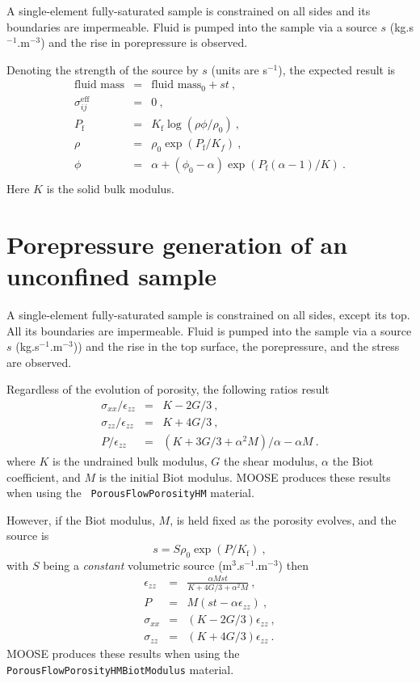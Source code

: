 \documentclass[]{scrreprt}
\begin{document}
A single-element fully-saturated sample is constrained on all sides
and its boundaries are impermeable.  Fluid is pumped into the sample
via a source $s$ (kg.s$^{-1}$.m$^{-3}$) and the rise
in porepressure is observed.

Denoting the strength of the source by $s$ (units are s$^{-1}$), the expected result is
\begin{eqnarray}
\mbox{fluid mass} & = & \mbox{fluid mass}_{0} + st \ , \nonumber \\
\sigma_{ij}^{\mathrm{eff}} & = & 0 \ , \nonumber \\
P_{\mathrm{f}} & = & K_{\mathrm{f}}\log(\rho\phi/\rho_{0}) \ , \nonumber
\\
\rho & = & \rho_{0}\exp(P_{\mathrm{f}}/K_{f}) \ , \nonumber \\
\phi & = & \alpha + (\phi_{0}-\alpha)\exp\left(
P_{\mathrm{f}}(\alpha - 1)/K\right) \ . \\
\end{eqnarray}
Here $K$ is the solid bulk modulus.

\section{Porepressure generation of an unconfined sample}

A single-element fully-saturated sample is constrained on all sides,
except its top.  All its boundaries are impermeable.  Fluid is pumped
into the sample via a source $s$ (kg.s$^{-1}$.m$^{-3}$)) and the rise
in the top surface, the porepressure, and the stress are observed.

Regardless of the evolution of porosity, the following ratios result
\begin{eqnarray}
\sigma_{xx}/\epsilon_{zz} & = & K - 2G/3 \ , \nonumber \\
\sigma_{zz}/\epsilon_{zz} & = & K + 4G/3 \ , \nonumber \\
P/\epsilon_{zz} & = & (K + 3G/3 + \alpha^{2}M)/\alpha - \alpha M \ .
\end{eqnarray}
where $K$ is the undrained bulk modulus, $G$ the shear modulus,
$\alpha$ the Biot coefficient, and $M$ is the initial Biot modulus.
MOOSE produces these results when using the {\tt
  PorousFlowPorosityHM} material.


However, if the Biot modulus, $M$, is held fixed as the porosity
evolves, and the source is
\begin{equation}
s = S \rho_{0}\exp(P/K_{\mathrm{f}}) \ ,
\end{equation}
with $S$ being a {\em constant} volumetric source
(m$^{3}$.s$^{-1}$.m$^{-3}$) then
\begin{eqnarray}
\epsilon_{zz} & = & \frac{\alpha M s t}{K + 4G/3 + \alpha^{2}M} \ ,
\nonumber \\
P & = & M(st - \alpha\epsilon_{zz}) \ , \nonumber \\
\sigma_{xx} & = & (K - 2G/3)\epsilon_{zz} \ , \nonumber \\
\sigma_{zz} & = & (K + 4G/3)\epsilon_{zz} \ .
\end{eqnarray}
MOOSE produces these results when using the {\tt
  PorousFlowPorosityHMBiotModulus} material.
\end{document}
